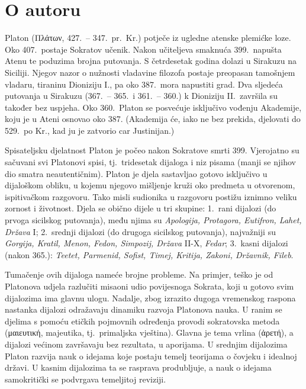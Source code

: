 \section*{O autoru}

Platon \textgreek[variant=ancient]{(Πλάτων,} 427.\ – 347.\ pr.~Kr.)  potječe iz ugledne atenske plemićke loze. Oko 407.\ postaje Sokratov učenik. Nakon učiteljeva smaknuća 399.\ napušta Atenu te poduzima brojna putovanja. S četrdesetak godina dolazi u Sirakuzu na Siciliji. Njegov nazor o nužnosti vladavine filozofa postaje preopasan tamošnjem vladaru, tiraninu Dioniziju I., pa oko 387.\ mora napustiti grad. Dva sljedeća putovanja u Sirakuzu (367.\ – 365.\ i 361.\ – 360.) k Dioniziju II.\ završila su također bez uspjeha. Oko 360.\ Platon se posvećuje isključivo vođenju Akademije, koju je u Ateni osnovao oko 387. (Akademija će, iako ne bez prekida, djelovati do 529.\ po Kr., kad ju je zatvorio car Justinijan.)

Spisateljsku djelatnost Platon je počeo nakon Sokratove smrti 399. Vjerojatno su sačuvani svi Platonovi spisi, tj.\ tridesetak dijaloga i niz pisama (manji se njihov dio smatra neautentičnim). Platon je djela sastavljao gotovo isključivo u dijaloškom obliku, u kojemu njegovo mišljenje kruži oko predmeta u otvorenom, ispitivačkom razgovoru. Tako misli sudionika u razgovoru postižu iznimno veliku zornost i životnost. Djela se obično dijele u tri skupine: 1.\ rani dijalozi (do prvoga sicilskog putovanja), među njima su \textit{Apologija, Protagora, Eutifron, Lahet, Država} I; 2.\ srednji dijalozi (do drugoga sicilskog putovanja), najvažniji su \textit{Gorgija, Kratil, Menon, Fedon, Simpozij, Država} II-X, \textit{Fedar}; 3.\ kasni dijalozi (nakon 365.): \textit{Teetet, Parmenid, Sofist, Timej, Kritija, Zakoni, Državnik, Fileb}. 

Tumačenje ovih dijaloga nameće brojne probleme. Na primjer, teško je od Platonova udjela razlučiti misaoni udio povijesnoga Sokrata, koji u gotovo svim dijalozima ima glavnu ulogu. Nadalje, zbog izrazito dugoga vremenskog raspona nastanka dijalozi odražavaju dinamiku razvoja Platonova nauka. U ranim se djelima s pomoću etičkih pojmovnih određenja provodi sokratovska metoda \textgreek[variant=ancient]{(μαιευτική,} majeutika, tj.\ primaljska vještina). Glavna je tema vrlina \textgreek[variant=ancient]{(ἀρετή),} a dijalozi većinom završavaju bez rezultata, u aporijama. U srednjim dijalozima Platon razvija nauk o idejama koje postaju temelj teorijama o čovjeku i idealnoj državi. U kasnim dijalozima ta se rasprava produbljuje, a nauk o idejama samokritički se podvrgava temeljitoj reviziji. 

